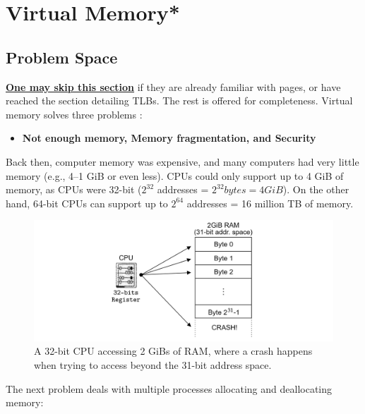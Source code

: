 \section{Virtual Memory*}
\subsection{Problem Space}
\noindent
\underline{\textbf{One may skip this section}} if they are already familiar with pages, or have reached the section detailing TLBs. The 
rest is offered for completeness.
Virtual memory solves three problems \cite{virtualmemory2023}:
\begin{itemize}
    \item \textbf{Not enough memory, Memory fragmentation, and Security}
\end{itemize}
\begin{Def}

    Back then, computer memory was expensive, and many computers had very little memory (e.g., 4--1 GiB or even less).
    CPUs could only support up to 4 GiB of memory, as CPUs were 32-bit ($2^{32}$ addresses = $2^{32} bytes  = 4 GiB$). 
    On the other hand, 64-bit CPUs can support up to $2^{64}$ addresses = 16 million TB of memory.
\end{Def}

\begin{figure}[h]

    \hspace{-7em}
    \includegraphics[width=1.3\textwidth]{Sections/virt/crash.png}
    
    \vspace{1em}
    \caption{A 32-bit CPU accessing 2 GiBs of RAM, where a crash happens when trying to access beyond the 31-bit address space.}
    
    \label{fig:virt1}
\end{figure}
\newpage 

\noindent
The next problem deals with multiple processes allocating and deallocating memory:

